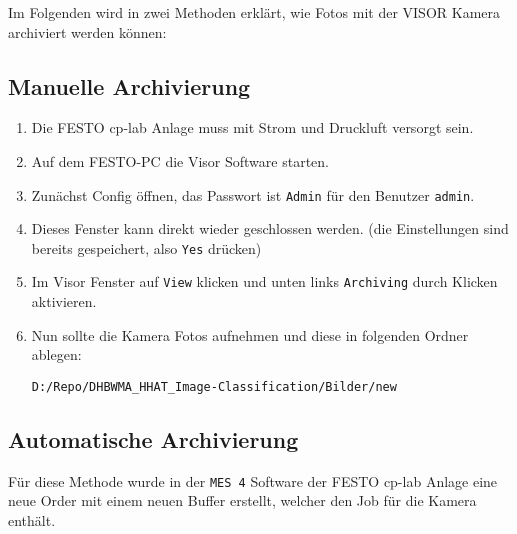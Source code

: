 Im Folgenden wird in zwei Methoden erklärt, wie Fotos mit der VISOR Kamera archiviert werden können:

\subsection{Manuelle Archivierung}

\begin{enumerate} 
    \item Die FESTO \ac{cp-lab} Anlage muss mit Strom und Druckluft versorgt sein.
    \item Auf dem FESTO-PC die Visor Software starten.
    \item Zunächst Config öffnen, das Passwort ist \texttt{Admin} für den Benutzer \texttt{admin}.
    \item Dieses Fenster kann direkt wieder geschlossen werden. (die Einstellungen sind bereits gespeichert, also \texttt{Yes} drücken)
    \item Im Visor Fenster auf \texttt{View} klicken und unten links \texttt{Archiving} durch Klicken aktivieren.
    \item Nun sollte die Kamera Fotos aufnehmen und diese in folgenden Ordner ablegen:
    
    \texttt{D:/Repo/DHBWMA\_HHAT\_Image-Classification/Bilder/new}

\end{enumerate}

\subsection{Automatische Archivierung}

Für diese Methode wurde in der \texttt{MES 4} Software der FESTO \ac{cp-lab} Anlage eine neue Order mit einem neuen Buffer erstellt, welcher den Job für die Kamera enthält. 

